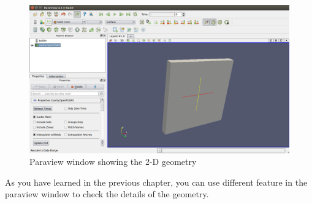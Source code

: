 \documentclass[a4paper,12pt]{report}
\begin{document}
\begin{figure}[ht]  
\begin{center}  
\includegraphics[scale=0.32]{paraview1.png}
\caption{Paraview window showing the 2-D geometry}
\label{paraview1}
\end{center}  
\end{figure}

\flushleft As you have learned in the previous chapter, you can use different feature in the paraview window to check the details of the geometry.
\end{document}
